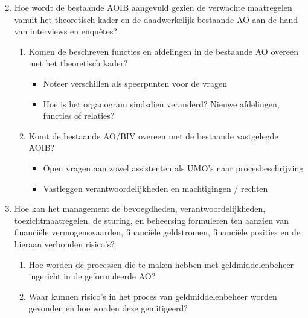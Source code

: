 \documentclass[10pt,a4paper,oneside]{report}
\begin{document}
\begin{enumerate}
    \setcounter{enumi}{1}
    \item Hoe wordt de bestaande AOIB aangevuld gezien de verwachte maatregelen vanuit het theoretisch kader en de daadwerkelijk bestaande AO aan de hand van interviews en enquêtes?
    \begin{enumerate}
        \item Komen de beschreven functies en afdelingen in de bestaande AO overeen met het theoretisch kader?
        \begin{itemize}
            \item Noteer verschillen als speerpunten voor de vragen
            \item Hoe is het organogram sindsdien veranderd? Nieuwe afdelingen, functies of relaties?
        \end{itemize}
        \item Komt de bestaande AO/BIV overeen met de bestaande vastgelegde AOIB?
        \begin{itemize}
            \item Open vragen aan zowel assistenten als UMO's naar procesbeschrijving
            \item Vastleggen verantwoordelijkheden en machtigingen / rechten
        \end{itemize}
    \end{enumerate}
\end{enumerate}



\begin{enumerate}
    \setcounter{enumi}{2}
    \item Hoe kan het management de bevoegdheden, verantwoordelijkheden, toezichtmaatregelen, de sturing, en beheersing formuleren ten aanzien van financiële vermogenswaarden, financiële geldstromen, financiële posities en de hieraan verbonden risico’s?
    \begin{enumerate}
        \item Hoe worden de processen die te maken hebben met geldmiddelenbeheer ingericht in de geformuleerde AO?
        \item Waar kunnen risico's in het proces van geldmiddelenbeheer worden gevonden en hoe worden deze gemitigeerd?
    \end{enumerate}
\end{enumerate}
\end{document}

